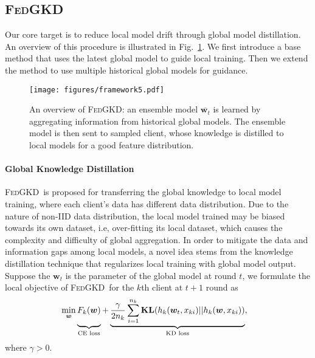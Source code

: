 \documentclass{article} %
\newcommand{\LS}{\mathcal{L}}
\newcommand{\w}{\boldsymbol{w}}
\DeclareMathOperator{\KL}{\boldsymbol{\mathbf{KL}}}
\newcommand{\system}{\textsc{FedGKD}\xspace}
\begin{document}


\subsection{\system}
Our core target is to reduce local model drift through global model distillation. An overview of this procedure is illustrated in Fig.~\ref{fig:framework}. We first introduce a base method that uses the latest global model to guide local training. Then we extend the method to use multiple historical global models for guidance.

\begin{figure}[t]
\centering
    \texttt{[image: figures/framework5.pdf]}
    \caption{An overview of \system: an ensemble model $\overline{\w_t}$ is learned by aggregating information from historical global models. The ensemble model is then sent to sampled client, whose knowledge is distilled to local models for a good feature distribution.}\label{fig:framework}
\end{figure}

\paragraph{Global Knowledge Distillation}
\system\ is proposed for transferring the global knowledge to local model training, where each client's data has different data distribution.
Due to the nature of non-IID data distribution,
the local model trained may be biased towards its own dataset, i.e, over-fitting its local dataset, which causes the complexity and difficulty of global aggregation.
In order to mitigate the data and information gaps among local models, a novel idea stems from the knowledge distillation technique that regularizes local training with global model output.
Suppose the $\w_t$ is the parameter of the global model at round $t$, we formulate the local objective of \system\ for the $k$th client at $t+1$ round as
\begin{align}
    &\min_{\w} { \underbrace{ F_k(\w) \vphantom{\sum_{i=1}^{n_k}} }_\text{CE loss} + 
    \underbrace{ \frac{\gamma}{2n_k}\sum_{i=1}^{n_k} \KL(h_k(\w_t,x_{ki}) || h_k(\w,x_{ki}))}_\text{KD loss} }, \label{eq:obj_sin} 
\end{align}
where $\gamma > 0$.
\end{document}
